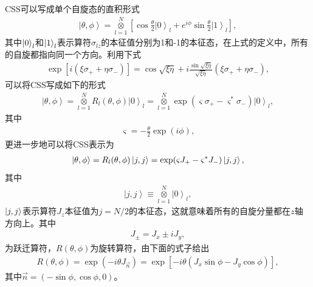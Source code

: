 CSS可以写成单个自旋态的直积形式
\begin{align}
	\left| {\theta ,\phi } \right\rangle  = \mathop  \otimes \limits_{l = 1}^N \left[ {\cos \frac{\theta }{2}{{\left| 0 \right\rangle }_l} + {e^{i\phi }}\sin \frac{\theta }{2}{{\left| 1 \right\rangle }_l}} \right],\label{eq3315}
\end{align}
其中$\ket{0}_l$和$\ket{1}_l$表示算符$\sigma_{lz}$的本征值分别为1和-1的本征态，在上式的定义中，所有的自旋都指向同一个方向。利用下式
\begin{align}
	\exp \left[ {i\left( {\xi {\sigma _ + } + \eta {\sigma _ - }} \right)} \right] = \cos \sqrt {\xi \eta }  + i\frac{{\sin \sqrt {\xi \eta } }}{{\sqrt {\xi \eta } }}\left( {\xi {\sigma _ + } + \eta {\sigma _ - }} \right),\label{eq3316}
\end{align}
可以将CSS写成如下的形式
\begin{align}
	\left| {\theta ,\phi } \right\rangle  = \mathop  \otimes \limits_{l = 1}^N {R_l}\left( {\theta ,\phi } \right){\left| 0 \right\rangle _l} = \mathop  \otimes \limits_{l = 1}^N \exp \left( {\varsigma {\sigma _ + } - {\varsigma ^*}{\sigma _ - }} \right){\left| 0 \right\rangle _l},\label{eq3317}
\end{align}
其中
\begin{align}
	\varsigma  =  - \frac{\theta }{2}\exp \left( {i\phi } \right),\label{eq3318}
\end{align}
更进一步地可以将CSS表示为
\begin{align}
	\ket {\theta ,\phi }  = {R_l}(\theta ,\phi )\ket {j,j}= \exp ( {\varsigma {J_ + } - {\varsigma ^*}{J_ - }} )\ket {j,j}  ,\label{eq3319}
\end{align}
其中
\begin{align}
	\left| {j,j} \right\rangle  \equiv \mathop  \otimes \limits_{l = 1}^N {\left| 0 \right\rangle _l},\label{eq3320}
\end{align}
$\ket{j,j}$表示算符$J_z$本征值为$j=N/2$的本征态，这就意味着所有的自旋分量都在$z$轴方向上。其中
\begin{align}
	{J_ \pm } = {J_x} \pm i{J_y},\label{eq3321}
\end{align}
为跃迁算符，$R\left( {\theta ,\phi } \right)$为旋转算符，由下面的式子给出
\begin{align}
	R\left( {\theta ,\phi } \right) = \exp \left( { - i\theta {J_{\vec n}}} \right) = \exp \left[ { - i\theta \left( {{J_x}\sin \phi  - {J_y}\cos \phi } \right)} \right],\label{eq3322}
\end{align}
其中$\vec n = \left( { - \sin \phi ,\cos \phi ,0} \right)$。

